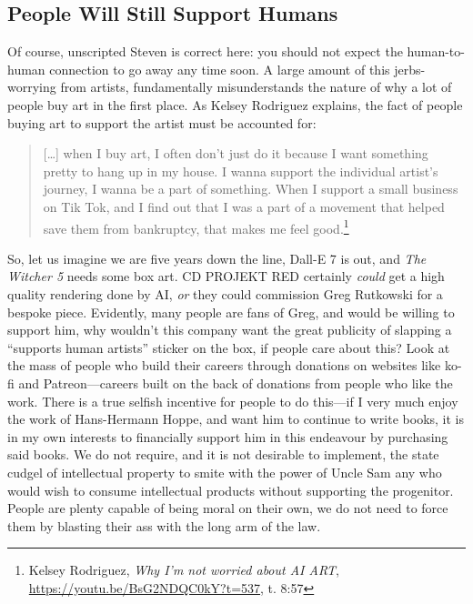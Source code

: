 \documentclass[11pt]{article}
\begin{document}
\subsection*{People Will Still Support Humans}
\label{sec:orgcd98ea8}
Of course, unscripted Steven is correct here: you should not expect the human-to-human connection to go away any time soon. A large amount of this jerbs-worrying from artists, fundamentally misunderstands the nature of why a lot of people buy art in the first place. As Kelsey Rodriguez explains, the fact of people buying art to support the artist must be accounted for:
\begin{quote}
[\ldots{}] when I buy art, I often don't just do it because I want something pretty to hang up in my house. I wanna support the individual artist's journey, I wanna be a part of something. When I support a small business on Tik Tok, and I find out that I was a part of a movement that helped save them from bankruptcy, that makes me feel good.\footnote{Kelsey Rodriguez, \emph{Why I'm not worried about AI ART}, \url{https://youtu.be/BsG2NDQC0kY?t=537}, t. 8:57}
\end{quote}

So, let us imagine we are five years down the line, Dall-E 7 is out, and \emph{The Witcher 5} needs some box art. CD PROJEKT RED certainly \emph{could} get a high quality rendering done by AI, \emph{or} they could commission Greg Rutkowski for a bespoke piece. Evidently, many people are fans of Greg, and would be willing to support him, why wouldn't this company want the great publicity of slapping a ``supports human artists'' sticker on the box, if people care about this? Look at the mass of people who build their careers through donations on websites like ko-fi and Patreon---careers built on the back of donations from people who like the work. There is a true selfish incentive for people to do this---if I very much enjoy the work of Hans-Hermann Hoppe, and want him to continue to write books, it is in my own interests to financially support him in this endeavour by purchasing said books. We do not require, and it is not desirable to implement, the state cudgel of intellectual property to smite with the power of Uncle Sam any who would wish to consume intellectual products without supporting the progenitor. People are plenty capable of being moral on their own, we do not need to force them by blasting their ass with the long arm of the law.
\end{document}
